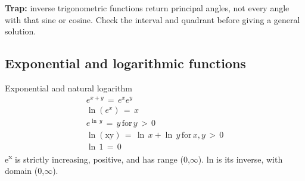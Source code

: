 \documentclass[11pt]{article}
\begin{document}
\begin{keepsection}
\begin{keepsection}
\begin{notebox}\textbf{Trap:} inverse trigonometric functions return principal angles, not every angle with that sine or cosine. Check the interval and quadrant before giving a general solution.\end{notebox}
\end{keepsection}

\begin{keepsection}
\subsection{Exponential and logarithmic functions}

\begin{equationcard}{Exponential and natural logarithm}
\[ \begin{gathered} {e}^{{x}+{y}}\, =\, {e}^{{x}}{e}^{{y}} \\ \ln ({e}^{{x}})\, =\, {x} \\ {e}^{\ln \, {y}}\, =\, {y}\, \text{for}\, {y}\, >\, 0 \\ \ln (\text{xy})\, =\, \ln \, {x}+\ln \, {y}\, \text{for}\, {x},{y}\, >\, 0 \\ \ln \, 1\, =\, 0 \end{gathered} \]
{\small e\textsuperscript{x} is strictly increasing, positive, and has range (0,\ensuremath{\infty}). ln is its inverse, with domain (0,\ensuremath{\infty}).}
\end{equationcard}


\end{keepsection}
\end{keepsection}
\end{document}
